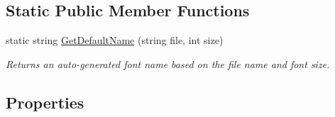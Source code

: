 \subsection*{Static Public Member Functions}
\begin{DoxyCompactItemize}
\item 
static string \hyperlink{class_tri_devs_1_1_tri_engine2_d_1_1_text_1_1_font_a27c7b15b894bd63bcebc831f00a1a0b3}{Get\-Default\-Name} (string file, int size)
\begin{DoxyCompactList}\small\item\em Returns an auto-\/generated font name based on the file name and font size. \end{DoxyCompactList}\end{DoxyCompactItemize}
\subsection*{Properties}
